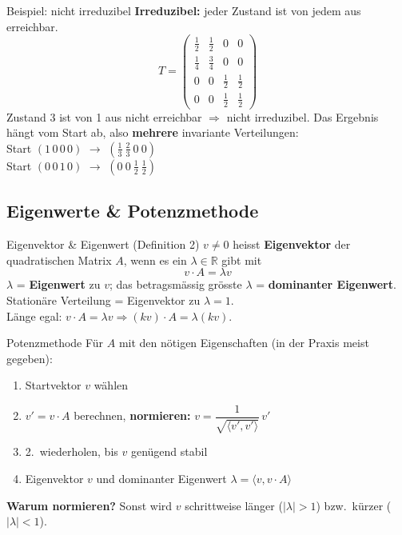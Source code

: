 \documentclass[a4paper, fontsize=7pt]{scrartcl}
\def\R{\mathbb{R}}  %
\renewcommand*{\arraystretch}{1.5}  %
\begin{document}
\begin{subbox}{Beispiel: nicht irreduzibel}
\renewcommand*{\arraystretch}{1.05}
\textbf{Irreduzibel:} jeder Zustand ist von jedem aus erreichbar.
$$T = \begin{pmatrix} \frac{1}{2} & \frac{1}{2} & 0 & 0\\[2pt]
\frac{1}{4} & \frac{3}{4} & 0 & 0\\[2pt]
0 & 0 & \frac{1}{2} & \frac{1}{2}\\[2pt]
0 & 0 & \frac{1}{2} & \frac{1}{2} \end{pmatrix}$$
Zustand 3 ist von 1 aus nicht erreichbar $\Rightarrow$ nicht irreduzibel.
Das Ergebnis hängt vom Start ab, also \textbf{mehrere} invariante Verteilungen:\\
Start $(1\,0\,0\,0)$ $\to$ $(\frac{1}{3}\ \frac{2}{3}\ 0\ 0)$\\
Start $(0\,0\,1\,0)$ $\to$ $(0\ 0\ \frac{1}{2}\ \frac{1}{2})$
\end{subbox}

\subsection{Eigenwerte \& Potenzmethode}

\begin{mainbox}{Eigenvektor \& Eigenwert (Definition 2)}
$v \neq 0$ heisst \textbf{Eigenvektor} der quadratischen Matrix $A$, wenn es ein
$\lambda \in \R$ gibt mit
$$\boxed{v \cdot A = \lambda v}$$
$\lambda$ = \textbf{Eigenwert} zu $v$; das betragsmässig grösste $\lambda$ =
\textbf{dominanter Eigenwert}.\\
Stationäre Verteilung = Eigenvektor zu $\lambda = 1$.\\
Länge egal: $v \cdot A = \lambda v \Rightarrow (kv) \cdot A = \lambda (kv)$.
\end{mainbox}

\begin{mainbox}{Potenzmethode}
Für $A$ mit den nötigen Eigenschaften (in der Praxis meist gegeben):
\begin{enumerate}
    \item Startvektor $v$ wählen
    \item $v' = v \cdot A$ berechnen, \textbf{normieren:}
          $v = \dfrac{1}{\sqrt{\langle v', v' \rangle}}\, v'$
    \item 2.\ wiederholen, bis $v$ genügend stabil
    \item Eigenvektor $v$ und dominanter Eigenwert
          $\boxed{\lambda = \langle v, v \cdot A \rangle}$
\end{enumerate}
\textbf{Warum normieren?} Sonst wird $v$ schrittweise länger ($|\lambda| > 1$) bzw.\
kürzer ($|\lambda| < 1$).
\end{mainbox}
\end{document}
